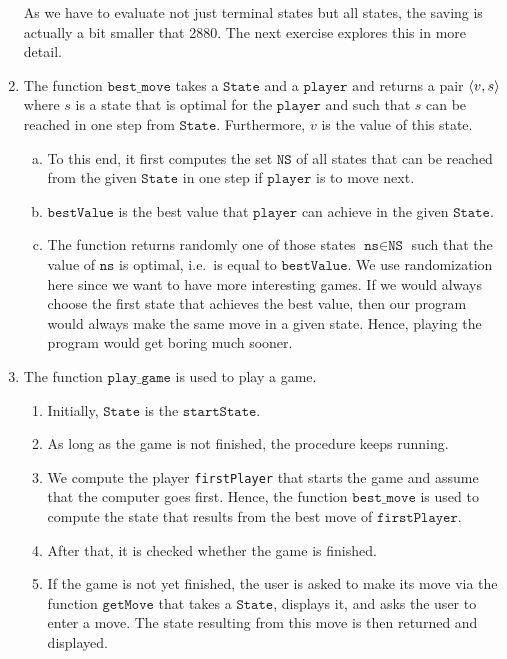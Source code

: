 \begin{enumerate}
      As we have to evaluate not just terminal states but all states, the saving is actually a bit smaller that
      2880.  The next exercise explores this in more detail.
\item The function $\texttt{best\_move}$ takes a $\texttt{State}$ and a $\texttt{player}$ and returns a pair $\pair(v,s)$
      where $s$ is a state that is optimal for the $\texttt{player}$ and such that $s$ can be reached in one step from
      $\texttt{State}$.  Furthermore, $v$ is the value of this state.
      \begin{enumerate}[(a)]
      \item To this end, it first computes the set $\texttt{NS}$ of all states that can be reached 
            from the given $\texttt{State}$ in one step if $\texttt{player}$ is to move next.
      \item $\texttt{bestValue}$ is the best value that $\texttt{player}$ can achieve in the given $\texttt{State}$.
      \item The function returns randomly one of those states $\texttt{ns} \in \texttt{NS}$ such that 
            the value of $\texttt{ns}$ is optimal, i.e.~is equal to $\texttt{bestValue}$.
            We use randomization here since we want to have more interesting games.  If we would always choose
            the first state that achieves the best value, then our program would always make the same move in
            a given state.  Hence, playing the program would get boring much sooner.
      \end{enumerate}
\item The function $\texttt{play\_game}$ is used to play a game.
      \begin{enumerate}
      \item Initially, $\texttt{State}$ is the $\texttt{startState}$.
      \item As long as the game is not finished, the procedure keeps running.
      \item We compute the player \texttt{firstPlayer} that starts the game and assume that the computer goes first.
            Hence, the function $\texttt{best\_move}$ is used to compute the state that results from the best
            move of $\texttt{firstPlayer}$.
      \item After that, it is checked whether the game is finished.
      \item If the game is not  yet finished, the user is asked to make its move via the function
            $\texttt{getMove}$ that takes a $\texttt{State}$, displays it, and asks the user to enter a move.
            The state resulting from this move is then returned and displayed.


\end{enumerate}
\end{enumerate}
